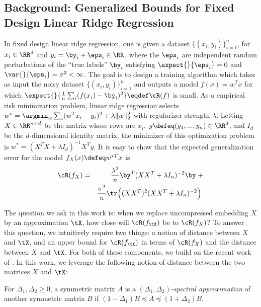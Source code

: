 \subsection{Background: Generalized Bounds for Fixed Design Linear Ridge Regression}
\label{subsec:fixed_design}
In fixed design linear ridge regression, one is given a dataset $\{(x_i,y_i)\}_{i=1}^n$, for $x_i \in \RR^d$ and $y_i = \by_i + \eps_i \in \RR$, where the $\eps_i$ are independent random perturbations of the ``true labels'' $\by_i$ satisfying $\expect{}{\eps_i} = 0$ and $\var{}{\eps_i} = \sigma^2 < \infty$.
The goal is to design a training algorithm which takes as input the noisy dataset $\{(x_i,y_i)\}_{i=1}^n$ and outputs a model $f(x) = w^T x$ for which $\expect{}{\frac{1}{n}\sum_i (f(x_i) -\by_i)^2} \eqdef \cR(f)$ is small.
As a empirical risk minimization problem, linear ridge regression selects $w^* = \argmin_w \sum_i (w^T x_i - y_i)^2 + \lambda\|w\|_2^2$ with regularizer strength $\lambda$.
Letting $X \in \RR^{n\times d}$ be the matrix whose rows are $x_i$, $y \defeq (y_1,...,y_n) \in \RR^d$, and $I_d$ be the $d$-dimensional identity matrix, the minimizer of this optimization problem is $w^* = ( X^T X + \lambda I_d)^{-1}X^Ty$.
It is easy to show \citep{alaoui15} that the expected generalization error for the model $f_X(x) \defeq w^{*T}x$ is
\begin{eqnarray*}
\cR(f_X) &=& \frac{\lambda^2}{n} \by^T(XX^T + \lambda I_n)^{-2}\by \; +\\ && \frac{\sigma^2}{n}\tr\Big((XX^T)^2(XX^T + \lambda I_n)^{-2}\Big).
\end{eqnarray*}

The question we ask in this work is: when we replace uncompressed embedding $X$ by an approximation $\tX$, how close will $\cR(f_{\tX})$ be to $\cR(f_X)$?
To answer this question, we intuitively require two things: a notion of distance between $X$ and $\tX$, and an upper bound for $\cR(f_{\tX})$ in terms of $\cR(f_X)$ and the distance between $X$ and $\tX$.
For both of these components, we build on the recent work of \citep{lprff18}.
In this work, we leverage the following notion of distance between the two matrices $X$ and $\tX$:

\begin{definition}{\citep{lprff18}}
	\label{def:specdist}
	For $\Delta_1, \Delta_2 \geq 0$, a symmetric matrix $A$ is a \emph{$(\Delta_1, \Delta_2)$-spectral approximation} of another symmetric matrix $B$ if $(1-\Delta_1)B \preceq A \preceq (1+\Delta_2)B$. 
\end{definition}

